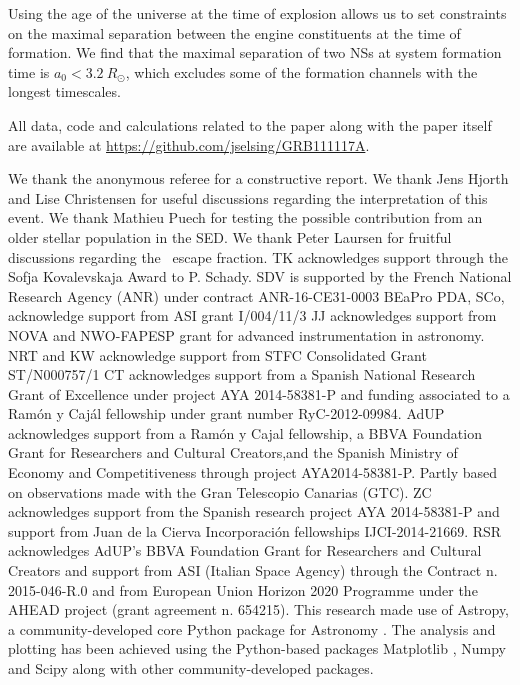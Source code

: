\documentclass{aa}    %
\begin{document}
Using the age of the universe at the time of explosion allows us to set
constraints on the maximal separation between the engine constituents at the
time of formation. We find that the maximal separation of two NSs at system
formation time is $a_0 < 3.2~R_\odot$, which excludes some of the formation
channels with the longest timescales.

All data, code and calculations related to the paper along with the
paper itself are available at \url{https://github.com/jselsing/GRB111117A}.

\begin{acknowledgements}
We thank the anonymous referee for a constructive report. 
%
We thank Jens Hjorth and Lise Christensen for useful discussions regarding the interpretation of this event. We thank Mathieu Puech for testing the possible contribution from an older stellar population in the SED. We thank Peter Laursen for fruitful discussions regarding the \lya~escape fraction.
%	
TK acknowledges support through the Sofja Kovalevskaja Award to P. Schady.
%
SDV is supported by the French National Research Agency (ANR) under contract ANR-16-CE31-0003 BEaPro 
%
PDA, SCo, acknowledge support from ASI grant I/004/11/3
%
JJ acknowledges support from NOVA and NWO-FAPESP grant for advanced
instrumentation in astronomy.
%
NRT and KW acknowledge support from STFC Consolidated
Grant ST/N000757/1
%
CT acknowledges support from a Spanish National Research Grant of Excellence
under project AYA 2014-58381-P and funding associated to a Ramón y Cajál
fellowship under grant number RyC-2012-09984.
%
AdUP acknowledges support from a Ramón y Cajal fellowship, a BBVA Foundation
Grant for Researchers and Cultural Creators,and the Spanish Ministry of Economy
and Competitiveness through project AYA2014-58381-P. Partly based on
observations made with the Gran Telescopio Canarias (GTC).
%
ZC acknowledges support from the Spanish research project AYA 2014-58381-P and
support from Juan de la Cierva Incorporaci\'on fellowships IJCI-2014-21669.
%
RSR acknowledges AdUP's BBVA Foundation Grant for Researchers and Cultural
Creators and support from ASI (Italian Space Agency) through the Contract n. 2015-046-R.0 and from European Union Horizon 2020 Programme under the AHEAD project (grant agreement n. 654215).
%
This research made use of Astropy, a community-developed core Python package for Astronomy \citep{TheAstropyCollaboration2013}. The analysis and plotting has been achieved using the Python-based packages Matplotlib \citep{Hunter2007}, Numpy and Scipy \citep{VanderWalt2011} along with other community-developed packages.

\end{acknowledgements}
\end{document}

